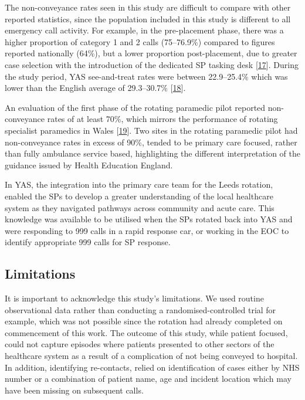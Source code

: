 \documentclass[
  a4paper,
  openany]{article}
\begin{document}
The non-conveyance rates seen in this study are difficult to compare with other reported statistics, since the population included in this study is different to all emergency call activity. For example, in the pre-placement phase, there was a higher proportion of category 1 and 2 calls (75--76.9\%) compared to figures reported nationally (64\%), but a lower proportion post-placement, due to greater case selection with the introduction of the dedicated SP tasking desk {[}\protect\hyperlink{ref-nhs_england_ambulance_2018}{17}{]}. During the study period, YAS see-and-treat rates were between 22.9--25.4\% which was lower than the English average of 29.3--30.7\% {[}\protect\hyperlink{ref-nhs_england_ambulance_2020}{18}{]}.

An evaluation of the first phase of the rotating paramedic pilot reported non-conveyance rates of at least 70\%, which mirrors the performance of rotating specialist paramedics in Wales {[}\protect\hyperlink{ref-association_of_ambulance_chief_executives_model_2019}{19}{]}. Two sites in the rotating paramedic pilot had non-conveyance rates in excess of 90\%, tended to be primary care focused, rather than fully ambulance service based, highlighting the different interpretation of the guidance issued by Health Education England.

In YAS, the integration into the primary care team for the Leeds rotation, enabled the SPs to develop a greater understanding of the local healthcare system as they navigated pathways across community and acute care. This knowledge was available to be utilised when the SPs rotated back into YAS and were responding to 999 calls in a rapid response car, or working in the EOC to identify appropriate 999 calls for SP response.

\hypertarget{limitations}{%
\subsection*{Limitations}\label{limitations}}

It is important to acknowledge this study's limitations. We used routine observational data rather than conducting a randomised-controlled trial for example, which was not possible since the rotation had already completed on commencement of this work. The outcome of this study, while patient focused, could not capture episodes where patients presented to other sectors of the healthcare system as a result of a complication of not being conveyed to hospital. In addition, identifying re-contacts, relied on identification of cases either by NHS number or a combination of patient name, age and incident location which may have been missing on subsequent calls.
\end{document}
